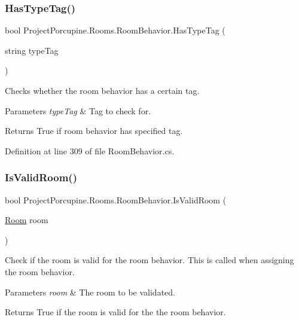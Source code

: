 \subsubsection{\texorpdfstring{Has\+Type\+Tag()}{HasTypeTag()}}
{\footnotesize\ttfamily bool Project\+Porcupine.\+Rooms.\+Room\+Behavior.\+Has\+Type\+Tag (\begin{DoxyParamCaption}\item[{string}]{type\+Tag }\end{DoxyParamCaption})}



Checks whether the room behavior has a certain tag. 


\begin{DoxyParams}{Parameters}
{\em type\+Tag} & Tag to check for.\\
\hline
\end{DoxyParams}
\begin{DoxyReturn}{Returns}
True if room behavior has specified tag.
\end{DoxyReturn}


Definition at line 309 of file Room\+Behavior.\+cs.

\mbox{\label{class_project_porcupine_1_1_rooms_1_1_room_behavior_a2d9241fa5a087631437cffe86dbde6e2}} 
\subsubsection{\texorpdfstring{Is\+Valid\+Room()}{IsValidRoom()}}
{\footnotesize\ttfamily bool Project\+Porcupine.\+Rooms.\+Room\+Behavior.\+Is\+Valid\+Room (\begin{DoxyParamCaption}\item[{\hyperlink{class_project_porcupine_1_1_rooms_1_1_room}{Room}}]{room }\end{DoxyParamCaption})}



Check if the room is valid for the room behavior. This is called when assigning the room behavior. 


\begin{DoxyParams}{Parameters}
{\em room} & The room to be validated.\\
\hline
\end{DoxyParams}
\begin{DoxyReturn}{Returns}
True if the room is valid for the the room behavior.
\end{DoxyReturn}



